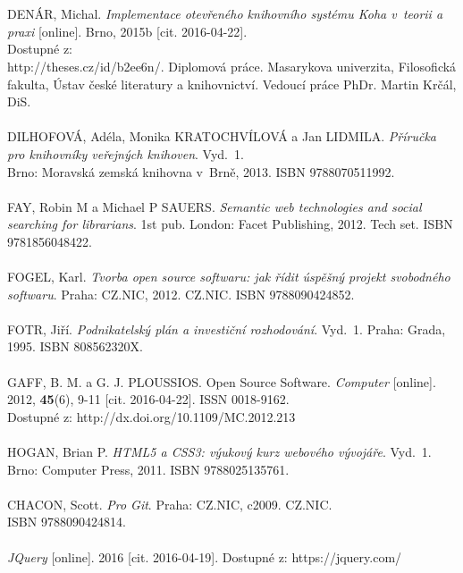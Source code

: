 \documentclass[
	11pt, oneside, printed, final, palatino, monochrome
	microtype,
	table,   %
	lof,     %
	lot     %
]{fithesis3}
\begin{document}
{~\\ ~\\ \noindent
[10] DENÁR, Michal. \textit{Implementace otevřeného knihovního systému Koha v~teorii a praxi} [online]. Brno, 2015b [cit. 2016-04-22]. \\Dostupné z: \\http://theses.cz/id/b2ee6n/. Diplomová práce. Masarykova univerzita, Filosofická fakulta, Ústav české literatury a knihovnictví. Vedoucí práce PhDr. Martin Krčál, DiS.
~\\ ~\\ \noindent
[11] DILHOFOVÁ, Adéla, Monika KRATOCHVÍLOVÁ a Jan LIDMILA. \textit{Příručka pro knihovníky veřejných knihoven}. Vyd.~1. \\Brno: Moravská zemská knihovna v~Brně, 2013. ISBN 9788070511992.
~\\ ~\\ \noindent
[12] FAY, Robin M a Michael P SAUERS. \textit{Semantic web technologies and social searching for librarians}. 1st pub. London: Facet Publishing, 2012. Tech set. ISBN 9781856048422.
~\\ ~\\ \noindent
[13] FOGEL, Karl. \textit{Tvorba open source softwaru: jak řídit úspěšný projekt svobodného softwaru}. Praha: CZ.NIC, 2012. CZ.NIC. ISBN 9788090424852.
~\\ ~\\ \noindent
[14] FOTR, Jiří. \textit{Podnikatelský plán a investiční rozhodování}. Vyd.~1. Praha: Grada, 1995. ISBN 808562320X.
~\\ ~\\ \noindent
[15] GAFF, B. M. a G. J. PLOUSSIOS. Open Source Software. \textit{Computer} [online]. 2012, 	\textbf{45}(6), 9-11 [cit. 2016-04-22]. ISSN 0018-9162. \\Dostupné z: http://dx.doi.org/10.1109/MC.2012.213
~\\ ~\\ \noindent
[16] HOGAN, Brian P. \textit{HTML5 a CSS3: výukový kurz webového vývojáře}. Vyd.~1. Brno: Computer Press, 2011. ISBN 9788025135761.
~\\ ~\\ \noindent
[17] CHACON, Scott. \textit{Pro Git}. Praha: CZ.NIC, c2009. CZ.NIC. \\ISBN 9788090424814.
~\\ ~\\ \noindent
[18] \textit{JQuery} [online]. 2016 [cit. 2016-04-19]. Dostupné z: https://jquery.com/
~\\ ~\\ \noindent
}
\end{document}
